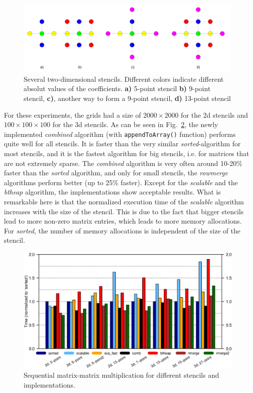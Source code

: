 \begin{figure}[tb]
	\centering
	\includegraphics[width=0.99\textwidth, trim={0 0.cm 0 0cm},clip]{stencils}
	\caption{Several two-dimensional stencils. Different colors indicate different absolut values of the coefficients. \textbf{a)} 5-point stencil \textbf{b)} 9-point stencil, \textbf{c)}, another way to form a 9-point stencil, \textbf{d)} 13-point stencil} 
	\label{fig:stencils}
\end{figure}


For these experiments, the grids had a size of $2000 \times 2000$ for the 2d stencils and $100\times 100 \times 100$ for the 3d stencils. As can be seen in Fig.~\ref{fig:ex209_R}, the newly implemented \textit{combined} algorithm (with \texttt{appendToArray()} function) performs quite well for all stencils. It is faster than the very similar \textit{sorted}-algorithm for most stencils, and it is the fastest algorithm for big stencils, i.e. for matrices that are not extremely sparse. The \textit{combined} algorithm is very often around 10-20\% faster than the \textit{sorted} algorithm, and only for small stencils, the \textit{rowmerge} algorithms perform better (up to 25\% faster). Except for the \textit{scalable} and the \textit{btheap} algorithm, the implementations show acceptable results. What is remarkable here is that the normalized execution time of the \textit{scalable} algorithm increases with the size of the stencil. This is due to the fact that bigger stencils lead to more non-zero matrix entries, which leads to more memory allocations. For \textit{sorted}, the number of memory allocations is independent of the size of the stencil.

\begin{figure}[tb]
	\centering
	\hspace*{-10mm}\includegraphics[width=1.1\textwidth, trim={0 7.cm 0 1.6cm},clip]{petsc-matmatmult}
	\caption{Sequential matrix-matrix multiplication for different stencils and implementations.} 
	\label{fig:ex209_R}
\end{figure}

